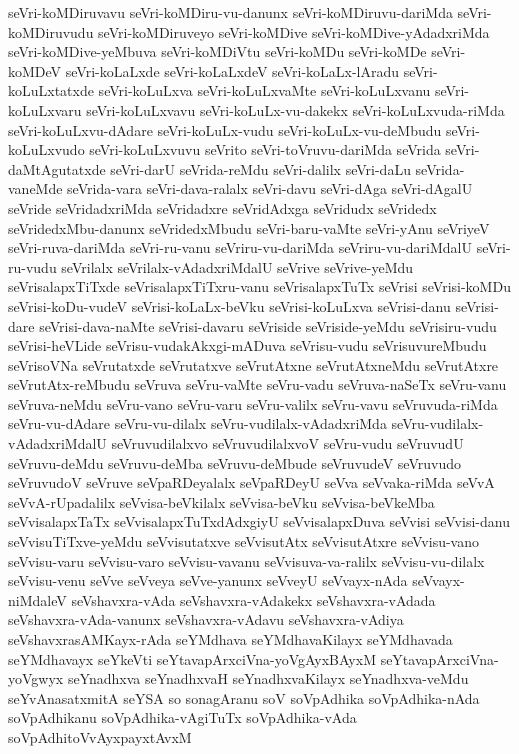 {seVri-koMDiruvavu
seVri-koMDiru-vu-danunx
seVri-koMDiruvu-dariMda
seVri-koMDiruvudu
seVri-koMDiruveyo
seVri-koMDive
seVri-koMDive-yAdadxriMda
seVri-koMDive-yeMbuva
seVri-koMDiVtu
seVri-koMDu
seVri-koMDe
seVri-koMDeV
seVri-koLaLxde
seVri-koLaLxdeV
seVri-koLaLx-lAradu
seVri-koLuLxtatxde
seVri-koLuLxva
seVri-koLuLxvaMte
seVri-koLuLxvanu
seVri-koLuLxvaru
seVri-koLuLxvavu
seVri-koLuLx-vu-dakekx
seVri-koLuLxvuda-riMda
seVri-koLuLxvu-dAdare
seVri-koLuLx-vudu
seVri-koLuLx-vu-deMbudu
seVri-koLuLxvudo
seVri-koLuLxvuvu
seVrito
seVri-toVruvu-dariMda
seVrida
seVri-daMtAgutatxde
seVri-darU
seVrida-reMdu
seVri-dalilx
seVri-daLu
seVrida-vaneMde
seVrida-vara
seVri-dava-ralalx
seVri-davu
seVri-dAga
seVri-dAgalU
seVride
seVridadxriMda
seVridadxre
seVridAdxga
seVridudx
seVridedx
seVridedxMbu-danunx
seVridedxMbudu
seVri-baru-vaMte
seVri-yAnu
seVriyeV
seVri-ruva-dariMda
seVri-ru-vanu
seVriru-vu-dariMda
seVriru-vu-dariMdalU
seVri-ru-vudu
seVrilalx
seVrilalx-vAdadxriMdalU
seVrive
seVrive-yeMdu
seVrisalapxTiTxde
seVrisalapxTiTxru-vanu
seVrisalapxTuTx
seVrisi
seVrisi-koMDu
seVrisi-koDu-vudeV
seVrisi-koLaLx-beVku
seVrisi-koLuLxva
seVrisi-danu
seVrisi-dare
seVrisi-dava-naMte
seVrisi-davaru
seVriside
seVriside-yeMdu
seVrisiru-vudu
seVrisi-heVLide
seVrisu-vudakAkxgi-mADuva
seVrisu-vudu
seVrisuvureMbudu
seVrisoVNa
seVrutatxde
seVrutatxve
seVrutAtxne
seVrutAtxneMdu
seVrutAtxre
seVrutAtx-reMbudu
seVruva
seVru-vaMte
seVru-vadu
seVruva-naSeTx
seVru-vanu
seVruva-neMdu
seVru-vano
seVru-varu
seVru-valilx
seVru-vavu
seVruvuda-riMda
seVru-vu-dAdare
seVru-vu-dilalx
seVru-vudilalx-vAdadxriMda
seVru-vudilalx-vAdadxriMdalU
seVruvudilalxvo
seVruvudilalxvoV
seVru-vudu
seVruvudU
seVruvu-deMdu
seVruvu-deMba
seVruvu-deMbude
seVruvudeV
seVruvudo
seVruvudoV
seVruve
seVpaRDeyalalx
seVpaRDeyU
seVva
seVvaka-riMda
seVvA
seVvA-rUpadalilx
seVvisa-beVkilalx
seVvisa-beVku
seVvisa-beVkeMba
seVvisalapxTaTx
seVvisalapxTuTxdAdxgiyU
seVvisalapxDuva
seVvisi
seVvisi-danu
seVvisuTiTxve-yeMdu
seVvisutatxve
seVvisutAtx
seVvisutAtxre
seVvisu-vano
seVvisu-varu
seVvisu-varo
seVvisu-vavanu
seVvisuva-va-ralilx
seVvisu-vu-dilalx
seVvisu-venu
seVve
seVveya
seVve-yanunx
seVveyU
seVvayx-nAda
seVvayx-niMdaleV
seVshavxra-vAda
seVshavxra-vAdakekx
seVshavxra-vAdada
seVshavxra-vAda-vanunx
seVshavxra-vAdavu
seVshavxra-vAdiya
seVshavxrasAMKayx-rAda
seYMdhava
seYMdhavaKilayx
seYMdhavada
seYMdhavayx
seYkeVti
seYtavapArxciVna-yoVgAyxBAyxM
seYtavapArxciVna-yoVgwyx
seYnadhxva
seYnadhxvaH
seYnadhxvaKilayx
seYnadhxva-veMdu
seYvAnasatxmitA
seYSA
so
sonagAranu
soV
soVpAdhika
soVpAdhika-nAda
soVpAdhikanu
soVpAdhika-vAgiTuTx
soVpAdhika-vAda
soVpAdhitoVvAyxpayxtAvxM
}
